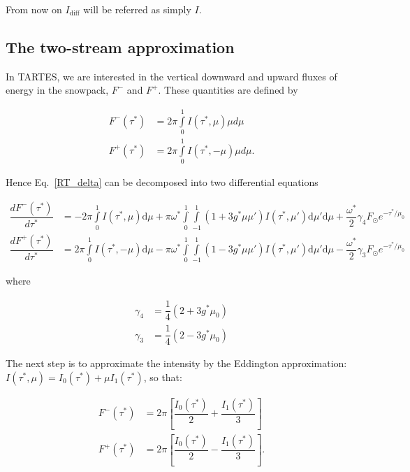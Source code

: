 \documentclass[a4paper,11pt]{article}
\begin{document}
\noindent From now on $I_{\textrm{diff}}$ will be referred as simply $I$.

  
\subsection{The two-stream approximation}

In TARTES, we are interested in the vertical downward and upward fluxes  of energy in the snowpack, $F^{-}$ and $F^{+}$. These quantities are defined by

\begin{subequations}
  \begin{align}
  	F^-(\tau^*) & =2\pi\displaystyle\int\limits_{0}^{1}I(\tau^*,\mu)\mu d\mu   \\
    F^+(\tau^*) & =2\pi\displaystyle\int\limits_{0}^{1}I(\tau^*,-\mu)\mu d\mu.
  \end{align}
\end{subequations} 

\noindent Hence Eq.~\ref{RT_delta} can be decomposed into two differential equations

\begin{align}
\dfrac{dF^-(\tau^*)}{d\tau^*} & =-2\pi\displaystyle\int\limits_{0}^{1}I(\tau^*,\mu) \mathrm{d}\mu  + \pi\omega^*  \displaystyle\int\limits_{0}^{1}\displaystyle\int\limits_{-1}^{1}(1+3g^*\mu\mu')I(\tau^*,\mu') \mathrm{d} \mu' \mathrm{d}\mu + \dfrac{\omega^*}{2} \gamma_4 F_\odot e^{-\tau^*/\mu_0}
\label{F-} \\
\dfrac{dF^+(\tau^*)}{d\tau^*} & =2\pi\displaystyle\int\limits_{0}^{1}I(\tau^*,-\mu) \mathrm{d}\mu  - \pi\omega^*  \displaystyle\int\limits_{0}^{1}\displaystyle\int\limits_{-1}^{1}(1-3g^*\mu\mu')I(\tau^*,\mu') \mathrm{d} \mu' \mathrm{d}\mu - \dfrac{\omega^*}{2} \gamma_3 F_\odot e^{-\tau^*/\mu_0}
\label{F+}
\end{align}  

where

\begin{align}
\gamma_4 & =\dfrac{1}{4}(2+3g^*\mu_0) \\
\gamma_3 & =\dfrac{1}{4}(2-3g^*\mu_0)
\end{align}

The next step is to approximate the intensity by the Eddington approximation: $I(\tau^*,\mu)=I_0(\tau^*)+\mu I_1(\tau^*)$, so that:

\begin{align}
F^-(\tau^*) & =2\pi\left[\dfrac{I_0(\tau^*)}{2}+\dfrac{I_1(\tau^*)}{3}\right] \\
F^+(\tau^*) & =2\pi\left[\dfrac{I_0(\tau^*)}{2}-\dfrac{I_1(\tau^*)}{3}\right].
\end{align}
\end{document}
